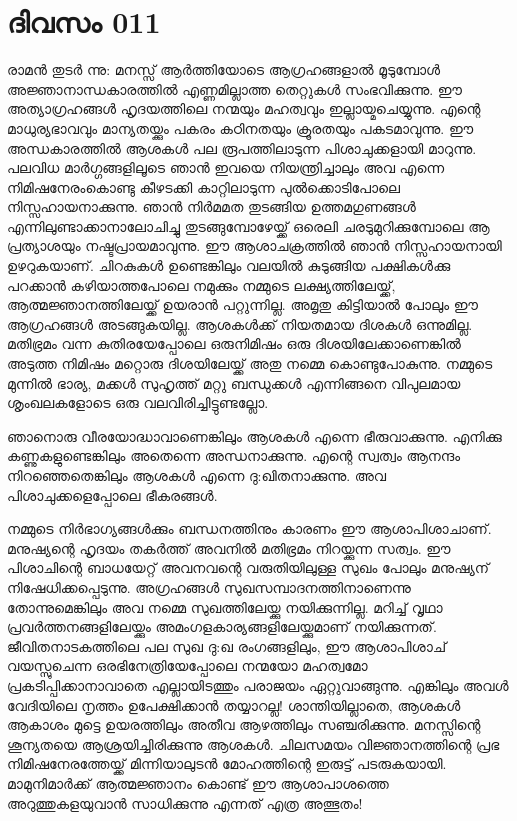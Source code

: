  
\section{ദിവസം 011}


രാമന്‍ തുടര്‍ ന്നു: മനസ്സ്‌ ആര്‍ത്തിയോടെ ആഗ്രഹങ്ങളാല്‍ മൂടുമ്പോള്‍ അജ്ഞാനാന്ധകാരത്തില്‍ എണ്ണമില്ലാത്ത തെറ്റുകള്‍ സംഭവിക്കുന്നു. ഈ അത്യാഗ്രഹങ്ങള്‍ ഹൃദയത്തിലെ നന്മയും മഹത്വവും ഇല്ലായ്മചെയ്യുന്നു. എന്റെ മാധുര്യഭാവവും മാന്യതയ്ക്കും പകരം കഠിനതയും ക്രൂരതയും പകടമാവുന്നു. ഈ അന്ധകാരത്തില്‍ ആശകള്‍ പല രൂപത്തിലാടുന്ന പിശാചുക്കളായി മാറുന്നു. പലവിധ മാര്‍ഗ്ഗങ്ങളിലൂടെ ഞാന്‍ ഇവയെ നിയന്ത്രിച്ചാലും അവ എന്നെ നിമിഷനേരംകൊണ്ടു കീഴടക്കി കാറ്റിലാടുന്ന പുല്‍ക്കൊടിപോലെ നിസ്സഹായനാക്കുന്നു. ഞാന്‍ നിര്‍മമത തുടങ്ങിയ ഉത്തമഗുണങ്ങള്‍ എന്നിലുണ്ടാക്കാനാലോചിച്ചു തുടങ്ങുമ്പോഴേയ്ക്ക്‌ ഒരെലി ചരടുമുറിക്കുമ്പോലെ ആ പ്രത്യാശയും നഷ്ടപ്രായമാവുന്നു. ഈ ആശാചക്രത്തില്‍ ഞാന്‍ നിസ്സഹായനായി ഉഴറുകയാണ്‌. ചിറകുകള്‍ ഉണ്ടെങ്കിലും വലയില്‍ കുടുങ്ങിയ പക്ഷികള്‍ക്കു പറക്കാന്‍ കഴിയാത്തപോലെ നമുക്കും നമ്മുടെ ലക്ഷ്യത്തിലേയ്ക്ക്, ആത്മജ്ഞാനത്തിലേയ്ക്ക്‌ ഉയരാന്‍ പറ്റുന്നില്ല. അമൃതു കിട്ടിയാല്‍ പോലും ഈ ആഗ്രഹങ്ങള്‍ അടങ്ങുകയില്ല. ആശകള്‍ക്ക്‌ നിയതമായ ദിശകള്‍ ഒന്നുമില്ല. മതിഭ്രമം വന്ന കുതിരയേപ്പോലെ ഒരുനിമിഷം ഒരു ദിശയിലേക്കാണെങ്കില്‍ അടുത്ത നിമിഷം മറ്റൊരു ദിശയിലേയ്ക്ക്‌ അതു നമ്മെ കൊണ്ടുപോകുന്നു. നമ്മുടെ മുന്നില്‍ ഭാര്യ, മക്കള്‍ സുഹൃത്ത്‌ മറ്റു ബന്ധുക്കള്‍ എന്നിങ്ങനെ വിപുലമായ ശൃംഖലകളോടെ ഒരു വലവിരിച്ചിട്ടുണ്ടല്ലോ.

ഞാനൊരു വീരയോദ്ധാവാണെങ്കിലും ആശകള്‍ എന്നെ ഭീരുവാക്കുന്നു.
എനിക്കു കണ്ണുകളുണ്ടെങ്കിലും അതെന്നെ അന്ധനാക്കുന്നു.
എന്റെ സ്വത്വം ആനന്ദം നിറഞ്ഞെതെങ്കിലും ആശകള്‍ എന്നെ ദു:ഖിതനാക്കുന്നു.
അവ പിശാചുക്കളെപ്പോലെ ഭീകരങ്ങള്‍. 

നമ്മുടെ നിര്‍ഭാഗ്യങ്ങള്‍ക്കും ബന്ധനത്തിനും കാരണം ഈ ആശാപിശാചാണ്‌. മനുഷ്യന്റെ ഹൃദയം തകര്‍ത്ത്‌ അവനില്‍ മതിഭ്രമം നിറയ്ക്കുന്ന സത്വം. ഈ പിശാചിന്റെ ബാധയേറ്റ്‌ അവനവന്റെ വരുതിയിലുള്ള സുഖം പോലും മനുഷ്യന്‌ നിഷേധിക്കപ്പെടുന്നു. അഗ്രഹങ്ങള്‍ സുഖസമ്പാദനത്തിനാണെന്നു തോന്നുമെങ്കിലും അവ നമ്മെ സുഖത്തിലേയ്ക്കു നയിക്കുന്നില്ല. മറിച്ച്‌ വൃഥാ പ്രവര്‍ത്തനങ്ങളിലേയ്ക്കും അമംഗളകാര്യങ്ങളിലേയ്ക്കുമാണ്‌ നയിക്കുന്നത്‌. ജീവിതനാടകത്തിലെ പല സുഖ ദു:ഖ രംഗങ്ങളിലും, ഈ ആശാപിശാച്‌ വയസ്സുചെന്ന ഒരഭിനേത്രിയേപ്പോലെ നന്മയോ മഹത്വമോ പ്രകടിപ്പിക്കാനാവാതെ എല്ലായിടത്തും പരാജയം ഏറ്റുവാങ്ങുന്നു. എങ്കിലും അവള്‍ വേദിയിലെ നൃത്തം ഉപേക്ഷിക്കാന്‍ തയ്യാറല്ല! ശാന്തിയില്ലാതെ, ആശകള്‍ ആകാശം മുട്ടെ ഉയരത്തിലും അതീവ ആഴത്തിലും സഞ്ചരിക്കുന്നു. മനസ്സിന്റെ ശൂന്യതയെ ആശ്രയിച്ചിരിക്കുന്നു ആശകള്‍. ചിലസമയം വിജ്ഞാനത്തിന്റെ പ്രഭ നിമിഷനേരത്തേയ്ക്ക്‌ മിന്നിയാലുടന്‍ മോഹത്തിന്റെ ഇരുട്ട്‌ പടരുകയായി. മാമുനിമാര്‍ക്ക്‌ ആത്മജ്ഞാനം കൊണ്ട്‌ ഈ ആശാപാശത്തെ അറുത്തുകളയുവാന്‍ സാധിക്കുന്നു എന്നത്‌ എത്ര അത്ഭുതം!
